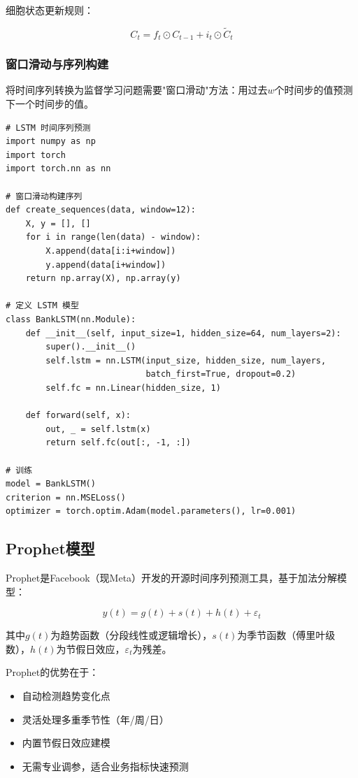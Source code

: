 细胞状态更新规则：

\[
C_t = f_t \odot C_{t-1} + i_t \odot \tilde{C}_t
\]

\subsubsection{窗口滑动与序列构建}

将时间序列转换为监督学习问题需要"窗口滑动"方法：用过去$w$个时间步的值预测下一个时间步的值。

\begin{lstlisting}[style=python]
# LSTM 时间序列预测
import numpy as np
import torch
import torch.nn as nn

# 窗口滑动构建序列
def create_sequences(data, window=12):
    X, y = [], []
    for i in range(len(data) - window):
        X.append(data[i:i+window])
        y.append(data[i+window])
    return np.array(X), np.array(y)

# 定义 LSTM 模型
class BankLSTM(nn.Module):
    def __init__(self, input_size=1, hidden_size=64, num_layers=2):
        super().__init__()
        self.lstm = nn.LSTM(input_size, hidden_size, num_layers,
                            batch_first=True, dropout=0.2)
        self.fc = nn.Linear(hidden_size, 1)

    def forward(self, x):
        out, _ = self.lstm(x)
        return self.fc(out[:, -1, :])

# 训练
model = BankLSTM()
criterion = nn.MSELoss()
optimizer = torch.optim.Adam(model.parameters(), lr=0.001)
\end{lstlisting}

\subsection{Prophet模型}

Prophet是Facebook（现Meta）开发的开源时间序列预测工具，基于加法分解模型：

\[
y(t) = g(t) + s(t) + h(t) + \varepsilon_t
\]

其中$g(t)$为趋势函数（分段线性或逻辑增长），$s(t)$为季节函数（傅里叶级数），$h(t)$为节假日效应，$\varepsilon_t$为残差。

Prophet的优势在于：
\begin{itemize}[leftmargin=2em]
  \item 自动检测趋势变化点
  \item 灵活处理多重季节性（年/周/日）
  \item 内置节假日效应建模
  \item 无需专业调参，适合业务指标快速预测
\end{itemize}

